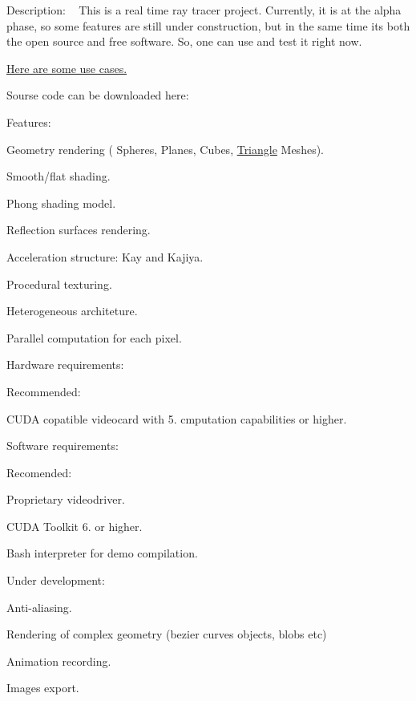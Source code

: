 
\begin{DoxyItemize}
\item Description\+: ~\newline
 This is a real time ray tracer project. Currently, it is at the alpha phase, so some features are still under construction, but in the same time it\textquotesingle{}s both the open source and free software. So, one can use and test it right now.
\begin{DoxyItemize}
\item \hyperlink{group__usecase}{Here are some use cases.}
\item Sourse code can be downloaded here\+:
\end{DoxyItemize}
\item Features\+:
\begin{DoxyItemize}
\item Geometry rendering ( Spheres, Planes, Cubes, \hyperlink{class_triangle}{Triangle} Meshes).
\item Smooth/flat shading.
\item Phong shading model.
\item Reflection surfaces rendering.
\item Acceleration structure\+: Kay and Kajiya.
\item Procedural texturing.
\item Heterogeneous architeture.
\item Parallel computation for each pixel.
\end{DoxyItemize}
\item Hardware requirements\+:
\begin{DoxyItemize}
\item Recommended\+:
\begin{DoxyItemize}
\item C\+U\+DA copatible videocard with 5. cmputation capabilities or higher.
\end{DoxyItemize}
\end{DoxyItemize}
\item Software requirements\+:
\begin{DoxyItemize}
\item Recomended\+:
\begin{DoxyItemize}
\item Proprietary videodriver.
\item C\+U\+DA Toolkit 6. or higher.
\item Bash interpreter for demo compilation.
\end{DoxyItemize}
\end{DoxyItemize}
\item Under development\+:
\begin{DoxyItemize}
\item Anti-\/aliasing.
\item Rendering of complex geometry (bezier curves objects, blobs etc)
\item Animation recording.
\item Images export. 
\end{DoxyItemize}
\end{DoxyItemize}